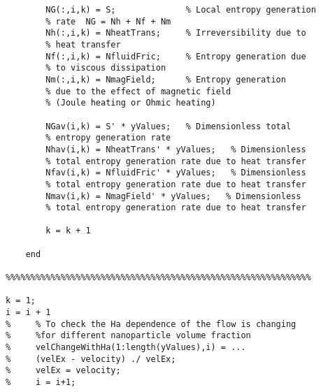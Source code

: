 \begin{lstlisting}
        NG(:,i,k) = S;              % Local entropy generation 
        % rate  NG = Nh + Nf + Nm
        Nh(:,i,k) = NheatTrans;     % Irreversibility due to 
        % heat transfer
        Nf(:,i,k) = NfluidFric;     % Entropy generation due 
        % to viscous dissipation
        Nm(:,i,k) = NmagField;      % Entropy generation 
        % due to the effect of magnetic field 
        % (Joule heating or Ohmic heating)
        
        NGav(i,k) = S' * yValues;   % Dimensionless total 
        % entropy generation rate
        Nhav(i,k) = NheatTrans' * yValues;   % Dimensionless 
        % total entropy generation rate due to heat transfer
        Nfav(i,k) = NfluidFric' * yValues;   % Dimensionless 
        % total entropy generation rate due to heat transfer
        Nmav(i,k) = NmagField' * yValues;   % Dimensionless 
        % total entropy generation rate due to heat transfer
        
        k = k + 1
        
    end
    
%%%%%%%%%%%%%%%%%%%%%%%%%%%%%%%%%%%%%%%%%%%%%%%%%%%%%%%%%%%%%
    
k = 1;
i = i + 1
%     % To check the Ha dependence of the flow is changing 
%     %for different nanoparticle volume fraction
%     velChangeWithHa(1:length(yValues),i) = ...
%     (velEx - velocity) ./ velEx;
%     velEx = velocity;
%     i = i+1;


\end{lstlisting}
